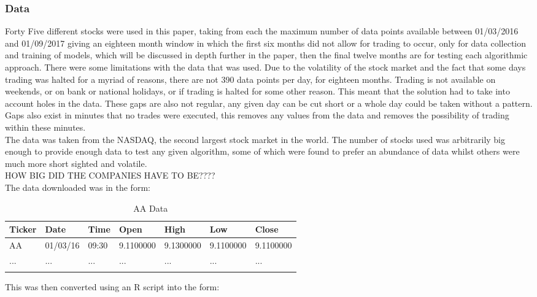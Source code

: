 \documentclass[12pt,a4paper]{article}
\begin{document}
\subsubsection{Data}

Forty Five different stocks were used in this paper, taking from each the maximum number of data points available between 01/03/2016 and 01/09/2017 giving an eighteen month window in which the first six months did not allow for trading to occur, only for data collection and training of models, which will be discussed in depth further in the paper, then the final twelve months are for testing each algorithmic approach. There were some limitations with the data that was used. Due to the volatility of the stock market and the fact that some days trading was halted for a myriad of reasons, there are not 390 data points per day, for eighteen months. Trading is not available on weekends, or on bank or national holidays, or if trading is halted for some other reason. This meant that the solution had to take into account holes in the data. These gaps are also not regular, any given day can be cut short or a whole day could be taken without a pattern. Gaps also exist in minutes that no trades were executed, this removes any values from the data and removes the possibility of trading within these minutes.\\

The data was taken from the NASDAQ, the second largest stock market in the world. The number of stocks used was arbitrarily big enough to provide enough data to test any given algorithm, some of which were found to prefer an abundance of data whilst others were much more short sighted and volatile. \\

HOW BIG DID THE COMPANIES HAVE TO BE???? \\

The data downloaded was in the form:

\label{units}
\begin{longtable}{ |p{1.5cm}|p{1.5cm}|p{1.5cm}|p{2cm}|p{2cm}|p{2cm}|p{2cm}| }\hline\hline
Ticker & Date & Time & Open & High & Low & Close \\ \hline
AA & 01/03/16 & 09:30 & 9.1100000 & 9.1300000 & 9.1100000 & 9.1100000 \\ \hline
... & ... & ... & ... & ... & ... & ... \\ \hline
\caption{AA Data}
\end{longtable}

This was then converted using an R script into the form:
\end{document}
